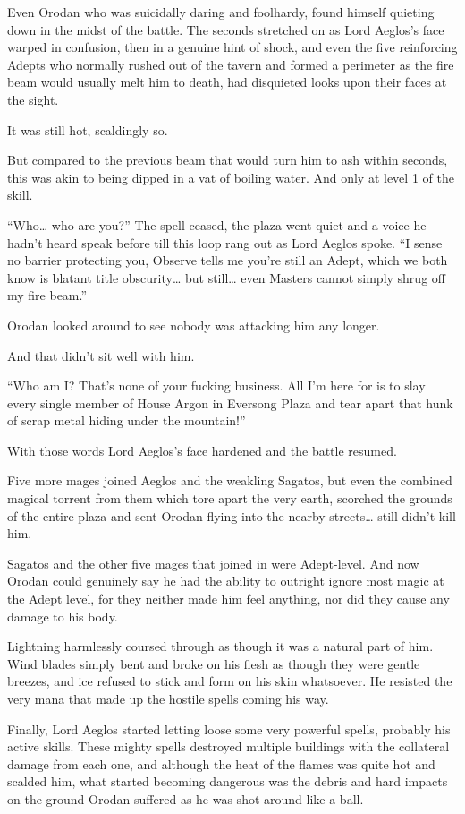 \documentclass[a4paper,10pt]{book}
\begin{document}
Even Orodan who was suicidally daring and foolhardy, found himself quieting down in the midst of the battle. The seconds stretched on as Lord Aeglos’s face warped in confusion, then in a genuine hint of shock, and even the five reinforcing Adepts who normally rushed out of the tavern and formed a perimeter as the fire beam would usually melt him to death, had disquieted looks upon their faces at the sight.\par
It was still hot, scaldingly so.\par
But compared to the previous beam that would turn him to ash within seconds, this was akin to being dipped in a vat of boiling water. And only at level 1 of the skill.\par
“Who… who are you?” The spell ceased, the plaza went quiet and a voice he hadn’t heard speak before till this loop rang out as Lord Aeglos spoke. “I sense no barrier protecting you, Observe tells me you’re still an Adept, which we both know is blatant title obscurity… but still… even Masters cannot simply shrug off my fire beam.”\par
Orodan looked around to see nobody was attacking him any longer.\par
And that didn’t sit well with him.\par
“Who am I? That’s none of your fucking business. All I’m here for is to slay every single member of House Argon in Eversong Plaza and tear apart that hunk of scrap metal hiding under the mountain!”\par
With those words Lord Aeglos’s face hardened and the battle resumed.\par
Five more mages joined Aeglos and the weakling Sagatos, but even the combined magical torrent from them which tore apart the very earth, scorched the grounds of the entire plaza and sent Orodan flying into the nearby streets… still didn’t kill him.\par
Sagatos and the other five mages that joined in were Adept-level. And now Orodan could genuinely say he had the ability to outright ignore most magic at the Adept level, for they neither made him feel anything, nor did they cause any damage to his body.\par
Lightning harmlessly coursed through as though it was a natural part of him. Wind blades simply bent and broke on his flesh as though they were gentle breezes, and ice refused to stick and form on his skin whatsoever. He resisted the very mana that made up the hostile spells coming his way.\par
Finally, Lord Aeglos started letting loose some very powerful spells, probably his active skills. These mighty spells destroyed multiple buildings with the collateral damage from each one, and although the heat of the flames was quite hot and scalded him, what started becoming dangerous was the debris and hard impacts on the ground Orodan suffered as he was shot around like a ball.\par
\end{document}
